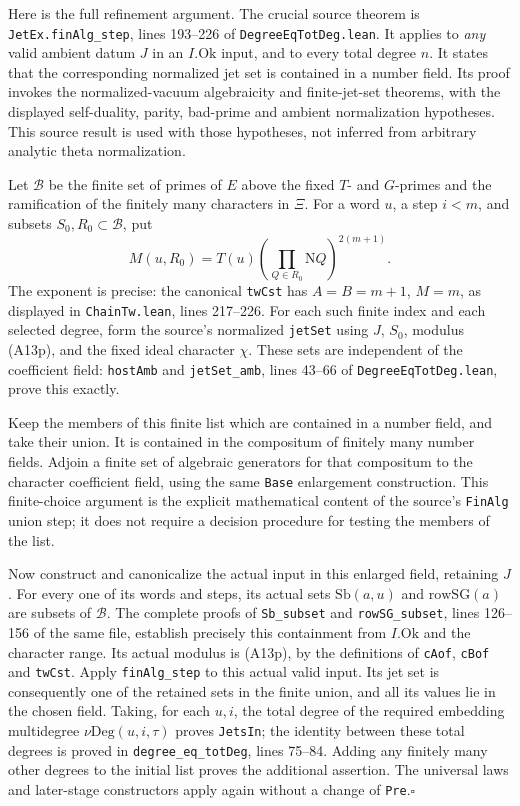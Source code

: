 \documentclass[11pt]{article}
\theoremstyle{definition}\newtheorem{definition}[theorem]{Definition}\newtheorem{remark}[theorem]{Remark}
\begin{document}
Here is the full refinement argument.  The crucial
source theorem is \texttt{JetEx.finAlg\_step},
lines 193--226 of
\texttt{DegreeEqTotDeg.lean}.  It applies to \emph{any}
valid ambient datum $J$ in an $I.\mathrm{Ok}$ input,
and to every total degree $n$.  It states that the
corresponding normalized jet set is contained in a
number field.  Its proof invokes the normalized-vacuum
algebraicity and finite-jet-set theorems, with the
displayed self-duality, parity, bad-prime and ambient
normalization hypotheses.  This source result is used
with those hypotheses, not inferred from arbitrary
analytic theta normalization.

Let $\mathcal B$ be the finite set of primes of $E$
above the fixed $T$- and $G$-primes and the ramification
of the finitely many characters in $\Xi$.
For a word $u$, a step $i<m$, and subsets
$S_0,R_0\subset\mathcal B$, put
\[
 M(u,R_0)=T(u)
             \left(\prod_{Q\in R_0}\mathrm NQ\right)^{2(m+1)}.
 \tag{A13p}
\]
The exponent is precise: the canonical
\texttt{twCst} has $A=B=m+1$, $M=m$,
as displayed in 
\texttt{ChainTw.lean}, lines 217--226.
For each such finite index and each selected degree,
form the source's normalized \texttt{jetSet} using
$J$, $S_0$, modulus (A13p), and the fixed ideal
character $\chi$.  These sets are independent of the
coefficient field: \texttt{hostAmb} and
\texttt{jetSet\_amb}, lines 43--66 of
\texttt{DegreeEqTotDeg.lean}, prove this exactly.

Keep the members of this finite list which are
contained in a number field, and take their union.
It is contained in the compositum of finitely many
number fields.  Adjoin a finite set of algebraic
generators for that compositum to the character
coefficient field, using the same \texttt{Base}
enlargement construction.  This finite-choice argument
is the explicit mathematical content of the source's
\texttt{FinAlg} union step; it does not require a
decision procedure for testing the members of the list.

Now construct and canonicalize the actual input in
this enlarged field, retaining $J$.  For every one of
its words and steps, its actual sets
$\mathrm{Sb}(a,u)$ and $\mathrm{rowSG}(a)$ are subsets
of $\mathcal B$.  The complete proofs of
\texttt{Sb\_subset} and \texttt{rowSG\_subset},
lines 126--156 of the same file, establish precisely
this containment from $I.\mathrm{Ok}$ and the character
range.  Its actual modulus is (A13p), by the definitions
of \texttt{cAof}, \texttt{cBof} and \texttt{twCst}.
Apply \texttt{finAlg\_step} to this actual valid input.
Its jet set is consequently one of the retained sets
in the finite union, and all its values lie in the
chosen field.  Taking, for each $u,i$, the total degree
of the required embedding multidegree
$\nu\mathrm{Deg}(u,i,\tau)$ proves
\texttt{JetsIn}; the identity between these total
degrees is proved in \texttt{degree\_eq\_totDeg},
lines 75--84.  Adding any finitely many other degrees
to the initial list proves the additional assertion.
The universal laws and later-stage constructors apply
again without a change of \texttt{Pre}.\hfill$\square$
\end{document}
